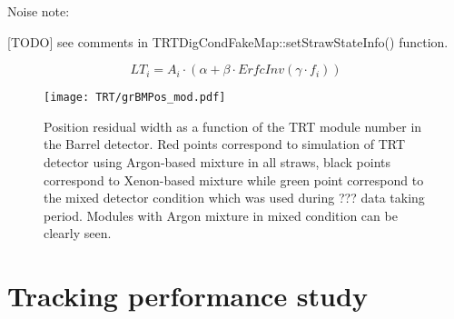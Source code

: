 Noise note:~\cite{Kittelmann:987854}

[TODO] see comments in TRTDigCondFakeMap::setStrawStateInfo() function.


\begin{equation}
 LT_i = A_i \cdot (\alpha + \beta \cdot ErfcInv(\gamma \cdot f_i)) %
\end{equation}





\begin{figure}
\begin{center}
 \texttt{[image: TRT/grBMPos\_mod.pdf]}
\caption{ Position residual width as a function of the TRT module number in the Barrel detector. Red points correspond to simulation of TRT detector
using Argon-based mixture in all straws, black points correspond to Xenon-based mixture while green point correspond to the mixed detector condition
which was used during ??? data taking period. Modules with Argon mixture in mixed condition can be clearly seen.}
\label{fig:meanFreePath}
\end{center}
\end{figure}

\section{Tracking performance study}
\label{sec:TRT:trackPerf}

